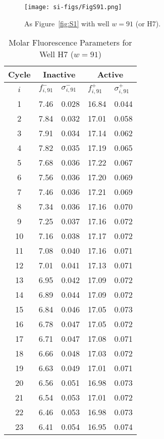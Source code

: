                 \begin{figure}
                    \centering
                    \texttt{[image: si-figs/FigS91.png]}
                    \caption{
                        As Figure~\ref{fig:S1} with well $w=91$ (or H7).
                    }
                \end{figure}
                \clearpage
    \begin{table}
        \caption{Molar Fluorescence Parameters for Well H7 ($w=91$)}
        \centering
        \begin{tabular}{c|ll|ll}
            Cycle & \multicolumn{2}{c|}{Inactive} & \multicolumn{2}{c}{Active} \\
            \hline
            $i$ & $f_{i,91}^{-}$ & $\sigma_{i,91}^{-}$ &  $f_{i,91}^{+}$ & $\sigma_{i,91}^{+}$ \\
            \hline
    1 & 7.46 & 0.028 & 16.84 & 0.044 \\
2 & 7.84 & 0.032 & 17.01 & 0.058 \\
3 & 7.91 & 0.034 & 17.14 & 0.062 \\
4 & 7.82 & 0.035 & 17.19 & 0.065 \\
5 & 7.68 & 0.036 & 17.22 & 0.067 \\
6 & 7.56 & 0.036 & 17.20 & 0.069 \\
7 & 7.46 & 0.036 & 17.21 & 0.069 \\
8 & 7.34 & 0.036 & 17.16 & 0.070 \\
9 & 7.25 & 0.037 & 17.16 & 0.072 \\
10 & 7.16 & 0.038 & 17.17 & 0.072 \\
11 & 7.08 & 0.040 & 17.16 & 0.071 \\
12 & 7.01 & 0.041 & 17.13 & 0.071 \\
13 & 6.95 & 0.042 & 17.09 & 0.072 \\
14 & 6.89 & 0.044 & 17.09 & 0.072 \\
15 & 6.84 & 0.046 & 17.05 & 0.073 \\
16 & 6.78 & 0.047 & 17.05 & 0.072 \\
17 & 6.71 & 0.047 & 17.08 & 0.071 \\
18 & 6.66 & 0.048 & 17.03 & 0.072 \\
19 & 6.63 & 0.049 & 17.01 & 0.071 \\
20 & 6.56 & 0.051 & 16.98 & 0.073 \\
21 & 6.54 & 0.053 & 17.01 & 0.072 \\
22 & 6.46 & 0.053 & 16.98 & 0.073 \\
23 & 6.41 & 0.054 & 16.95 & 0.074 \\

\end{tabular}
\end{table}
